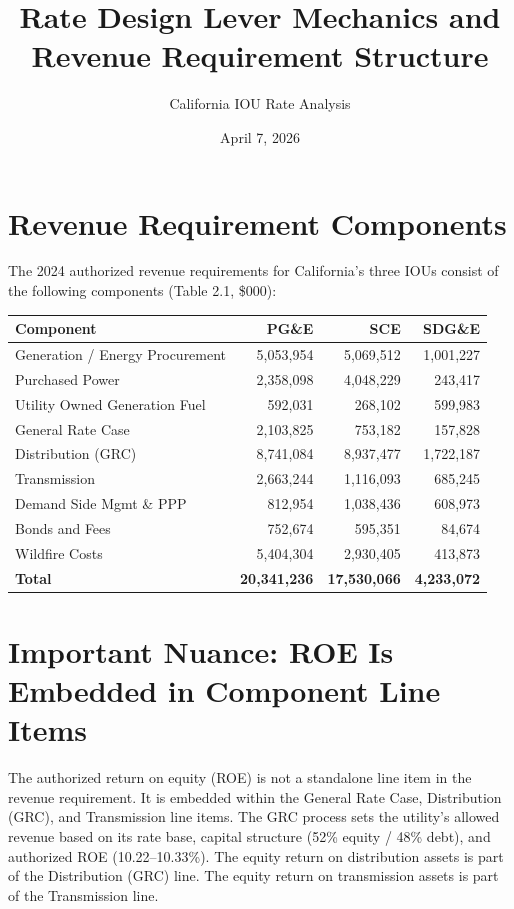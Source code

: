 \documentclass[11pt]{article}
\title{Rate Design Lever Mechanics and Revenue Requirement Structure}
\author{California IOU Rate Analysis}
\date{April 7, 2026}
\begin{document}
\maketitle

\section{Revenue Requirement Components}

The 2024 authorized revenue requirements for California's three IOUs consist of the following components (Table 2.1, \$000):

\begin{table}[htbp]
\centering
\small
\begin{tabular}{l r r r}
\toprule
\textbf{Component} & \textbf{PG\&E} & \textbf{SCE} & \textbf{SDG\&E} \\
\midrule
Generation / Energy Procurement & 5,053,954 & 5,069,512 & 1,001,227 \\
Purchased Power & 2,358,098 & 4,048,229 & 243,417 \\
Utility Owned Generation Fuel & 592,031 & 268,102 & 599,983 \\
General Rate Case & 2,103,825 & 753,182 & 157,828 \\
Distribution (GRC) & 8,741,084 & 8,937,477 & 1,722,187 \\
Transmission & 2,663,244 & 1,116,093 & 685,245 \\
Demand Side Mgmt \& PPP & 812,954 & 1,038,436 & 608,973 \\
Bonds and Fees & 752,674 & 595,351 & 84,674 \\
Wildfire Costs & 5,404,304 & 2,930,405 & 413,873 \\
\midrule
\textbf{Total} & \textbf{20,341,236} & \textbf{17,530,066} & \textbf{4,233,072} \\
\bottomrule
\end{tabular}
\end{table}

\section{Important Nuance: ROE Is Embedded in Component Line Items}

The authorized return on equity (ROE) is not a standalone line item in the revenue requirement. It is embedded within the General Rate Case, Distribution (GRC), and Transmission line items. The GRC process sets the utility's allowed revenue based on its rate base, capital structure (52\% equity / 48\% debt), and authorized ROE (10.22--10.33\%). The equity return on distribution assets is part of the Distribution (GRC) line. The equity return on transmission assets is part of the Transmission line.
\end{document}
